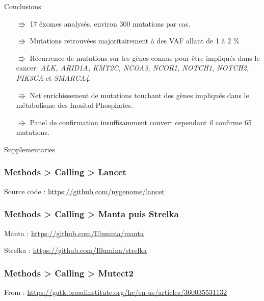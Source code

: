 \documentclass[aspectratio=169, 9pt]{beamer}
\begin{document}
{
\begin{frame}[c]
  \vspace{.6cm}
  \begin{alertblock}{\centering \large Conclusions}
    \begin{itemize}
        \item[$\Rrightarrow$] 17 éxomes analysés, environ 300 mutations par cas.
        \item[$\Rrightarrow$] Mutations retrouvées majoritairement à des VAF allant de 1 à 2 \%
        \item[$\Rrightarrow$] Récurrence de mutations sur les gènes connus pour être impliqués dans le cancer: 
        \textit{ALK, ARID1A, KMT2C, NCOA3, NCOR1, NOTCH1, NOTCH2, PIK3CA} et \textit{SMARCA4}.
        \item[$\Rrightarrow$] Net enrichissement de mutations touchant des gènes impliqués dans le métabolisme 
        des Inositol Phosphates.
        \item[$\Rrightarrow$] Panel de confirmation insuffisamment couvert cependant il confirme 65 mutations.
    \end{itemize}
  \end{alertblock}
\end{frame}
}

\begin{frame}[standout]
    Supplementaries
\end{frame}

\begin{frame}
    \frametitle{ Methods > Calling > Lancet}
    Source code : \url{https://github.com/nygenome/lancet}
    \vskip 0.2in
    
\end{frame}

\begin{frame}
    \frametitle{ Methods > Calling > Manta puis Strelka}
    \begin{footnotesize}
        Manta : \url{https://github.com/Illumina/manta}
        
        Strelka : \url{https://github.com/Illumina/strelka}
        
    \end{footnotesize}
\end{frame}

\begin{frame}
    \frametitle{ Methods > Calling > Mutect2}
    From : \footnotesize \url{https://gatk.broadinstitute.org/hc/en-us/articles/360035531132}
    
\end{frame}
\end{document}
